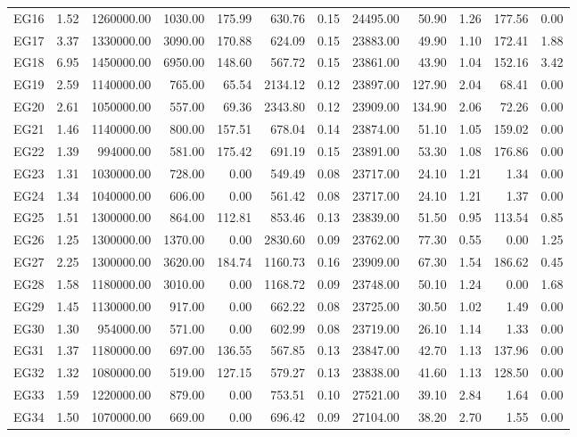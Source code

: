\begin{tabular}{lrrrrrrrrrrr}
EG16 & 1.52 & 1260000.00 & 1030.00 & 175.99 & 630.76 & 0.15 & 24495.00 & 50.90 & 1.26 & 177.56 & 0.00 \\
EG17 & 3.37 & 1330000.00 & 3090.00 & 170.88 & 624.09 & 0.15 & 23883.00 & 49.90 & 1.10 & 172.41 & 1.88 \\
EG18 & 6.95 & 1450000.00 & 6950.00 & 148.60 & 567.72 & 0.15 & 23861.00 & 43.90 & 1.04 & 152.16 & 3.42 \\
EG19 & 2.59 & 1140000.00 & 765.00 & 65.54 & 2134.12 & 0.12 & 23897.00 & 127.90 & 2.04 & 68.41 & 0.00 \\
EG20 & 2.61 & 1050000.00 & 557.00 & 69.36 & 2343.80 & 0.12 & 23909.00 & 134.90 & 2.06 & 72.26 & 0.00 \\
EG21 & 1.46 & 1140000.00 & 800.00 & 157.51 & 678.04 & 0.14 & 23874.00 & 51.10 & 1.05 & 159.02 & 0.00 \\
EG22 & 1.39 & 994000.00 & 581.00 & 175.42 & 691.19 & 0.15 & 23891.00 & 53.30 & 1.08 & 176.86 & 0.00 \\
EG23 & 1.31 & 1030000.00 & 728.00 & 0.00 & 549.49 & 0.08 & 23717.00 & 24.10 & 1.21 & 1.34 & 0.00 \\
EG24 & 1.34 & 1040000.00 & 606.00 & 0.00 & 561.42 & 0.08 & 23717.00 & 24.10 & 1.21 & 1.37 & 0.00 \\
EG25 & 1.51 & 1300000.00 & 864.00 & 112.81 & 853.46 & 0.13 & 23839.00 & 51.50 & 0.95 & 113.54 & 0.85 \\
EG26 & 1.25 & 1300000.00 & 1370.00 & 0.00 & 2830.60 & 0.09 & 23762.00 & 77.30 & 0.55 & 0.00 & 1.25 \\
EG27 & 2.25 & 1300000.00 & 3620.00 & 184.74 & 1160.73 & 0.16 & 23909.00 & 67.30 & 1.54 & 186.62 & 0.45 \\
EG28 & 1.58 & 1180000.00 & 3010.00 & 0.00 & 1168.72 & 0.09 & 23748.00 & 50.10 & 1.24 & 0.00 & 1.68 \\
EG29 & 1.45 & 1130000.00 & 917.00 & 0.00 & 662.22 & 0.08 & 23725.00 & 30.50 & 1.02 & 1.49 & 0.00 \\
EG30 & 1.30 & 954000.00 & 571.00 & 0.00 & 602.99 & 0.08 & 23719.00 & 26.10 & 1.14 & 1.33 & 0.00 \\
EG31 & 1.37 & 1180000.00 & 697.00 & 136.55 & 567.85 & 0.13 & 23847.00 & 42.70 & 1.13 & 137.96 & 0.00 \\
EG32 & 1.32 & 1080000.00 & 519.00 & 127.15 & 579.27 & 0.13 & 23838.00 & 41.60 & 1.13 & 128.50 & 0.00 \\
EG33 & 1.59 & 1220000.00 & 879.00 & 0.00 & 753.51 & 0.10 & 27521.00 & 39.10 & 2.84 & 1.64 & 0.00 \\
EG34 & 1.50 & 1070000.00 & 669.00 & 0.00 & 696.42 & 0.09 & 27104.00 & 38.20 & 2.70 & 1.55 & 0.00 \\

\end{tabular}
